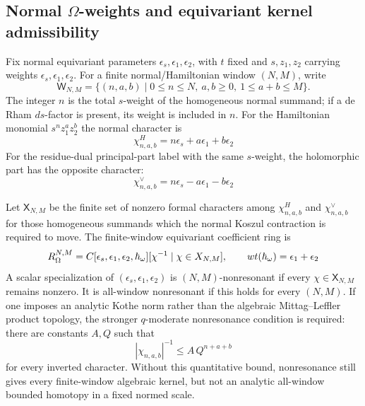 \subsection*{Normal \(\Omega\)-weights and equivariant kernel admissibility}

\begin{defn}\label{defn:wt-omega-normal-window}
  Fix normal equivariant parameters
  \(\epsilon_s,\epsilon_1,\epsilon_2\), with \(t\) fixed and
  \(s,z_1,z_2\) carrying weights
  \(\epsilon_s,\epsilon_1,\epsilon_2\).  For a finite normal/Hamiltonian
  window \((N,M)\), write
  \[
    \mathsf W_{N,M}
      =
    \{(n,a,b)\mid 0\leq n\leq N,\ a,b\geq0,\ 1\leq a+b\leq M\}.
  \]
  The integer \(n\) is the total \(s\)-weight of the homogeneous normal
  summand; if a de Rham \(ds\)-factor is present, its weight is included in
  \(n\).  For the Hamiltonian monomial \(s^n z_1^{a}z_2^{b}\) the normal
  character is
  \begin{equation}\label{eq:wt-omega-hamiltonian-character}
    \chi^H_{n,a,b}
      =
    n\epsilon_s+a\epsilon_1+b\epsilon_2
  \end{equation}
  For the residue-dual principal-part label with the same \(s\)-weight,
  the holomorphic part has the opposite character:
  \begin{equation}\label{eq:wt-omega-cotangent-character}
    \chi^\vee_{n,a,b}
      =
    n\epsilon_s-a\epsilon_1-b\epsilon_2
  \end{equation}

  Let \(\mathsf X_{N,M}\) be the finite set of nonzero formal characters
  among \(\chi^H_{n,a,b}\) and \(\chi^\vee_{n,a,b}\) for those homogeneous
  summands which the normal Koszul contraction is required to move.  The
  finite-window equivariant coefficient ring is
  \[
    R_{\Omega}^{N,M}
      =
    C[\epsilon_s,\epsilon_1,\epsilon_2,\hbar_\omega]
    [\chi^{-1}\mid \chi\in X_{N,M}],
    \qquad
    wt(\hbar_\omega)=\epsilon_1+\epsilon_2
  \]
  A scalar specialization of
  \((\epsilon_s,\epsilon_1,\epsilon_2)\) is
  \((N,M)\)-nonresonant if every \(\chi\in\mathsf X_{N,M}\) remains
  nonzero.  It is all-window nonresonant if this holds for every
  \((N,M)\).  If one imposes an analytic Kothe norm rather than the
  algebraic Mittag--Leffler product topology, the stronger
  \(q\)-moderate nonresonance condition is required:
  there are constants \(A,Q\) such that
  \[
    |\chi_{n,a,b}|^{-1}\leq A\,Q^{n+a+b}
  \]
  for every inverted character.  Without this quantitative bound,
  nonresonance still gives every finite-window algebraic kernel, but not
  an analytic all-window bounded homotopy in a fixed normed scale.
\end{defn}

